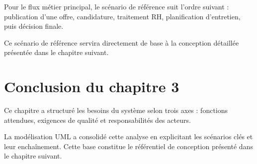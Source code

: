 Pour le flux métier principal, le scénario de référence suit l'ordre
suivant : publication d'une offre, candidature, traitement RH,
planification d'entretien, puis décision finale.

Ce scénario de référence servira directement de base à la conception
détaillée présentée dans le chapitre suivant.

\section*{Conclusion du chapitre 3}

Ce chapitre a structuré les besoins du système selon trois axes :
fonctions attendues, exigences de qualité et responsabilités des acteurs.

La modélisation UML a consolidé cette analyse en explicitant les scénarios
clés et leur enchaînement. Cette base constitue le référentiel de
conception présenté dans le chapitre suivant.
